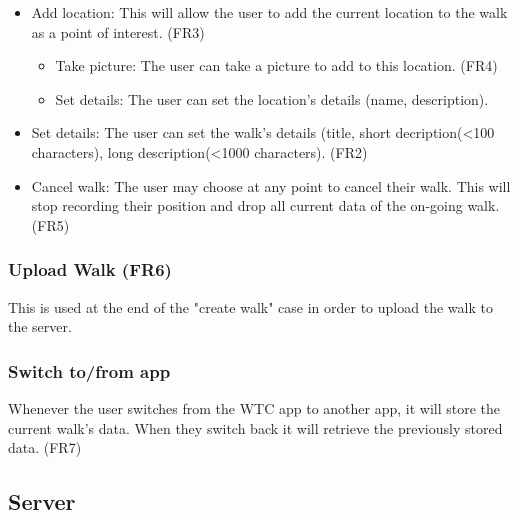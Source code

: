 \documentclass{project}
\begin{document}
\begin{itemize}
\item Add location: This will allow the user to add the current location to the walk as a point of interest. (FR3)
		\begin{itemize}
		\item Take picture: The user can take a picture to add to this location. (FR4)
		\item Set details: The user can set the location's details (name, description).
		\end{itemize}
\item Set details: The user can set the walk's details (title, short decription(<100 characters), long description(<1000 characters). (FR2)
\item Cancel walk: The user may choose at any point to cancel their walk. This will stop recording their position and drop all current data of the on-going walk. (FR5)
\end{itemize}

\subsubsection{Upload Walk (FR6)}
This is used at the end of the "create walk" case in order to upload the walk to the server.

\subsubsection{Switch to/from app}
Whenever the user switches from the WTC app to another app, it will store the current walk's data. When they switch back it will retrieve the previously stored data. (FR7)

\subsection{Server}
\begin{figure}[H]
\end{figure}
\end{document}
